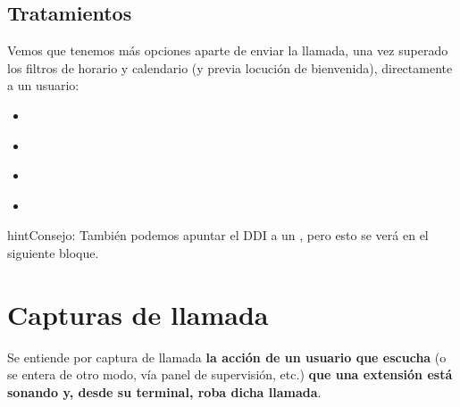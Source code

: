 \documentclass[letterpaper,10pt,spanish]{sphinxmanual}
\begin{document}
\subsection{Tratamientos}
\label{pbx_features/external_ddis:routing-logics}\label{pbx_features/external_ddis:ddi-routes}
Vemos que tenemos más opciones aparte de enviar la llamada, una vez superado los filtros de horario y calendario (y previa locución de bienvenida), directamente a un usuario:
\begin{itemize}
\item {} 
{\hyperref[pbx_features/huntgroups:huntgroups]{}}

\end{itemize}

\noindent{}
\begin{itemize}
\item {} 
{\hyperref[pbx_features/ivrs:generic\string-ivrs]{}}

\end{itemize}

\noindent{}
\begin{itemize}
\item {} 
{\hyperref[pbx_features/ivrs:custom\string-ivrs]{}}

\end{itemize}

\noindent{}
\begin{itemize}
\item {} 
{\hyperref[pbx_features/conference_rooms:conference\string-rooms]{}}

\end{itemize}

\noindent{}

\begin{notice}{hint}{Consejo:}
También podemos apuntar el DDI a un {\hyperref[faxing/index:faxing\string-system]{}}, pero esto se verá en el siguiente bloque.
\end{notice}


\section{Capturas de llamada}
\label{pbx_features/call_captures:capture-groups}\label{pbx_features/call_captures::doc}\label{pbx_features/call_captures:call-pickup}
Se entiende por captura de llamada \textbf{la acción de un usuario que escucha} (o se entera de otro modo, vía panel de supervisión, etc.) \textbf{que una extensión está sonando y, desde su terminal, roba dicha llamada}.
\end{document}
